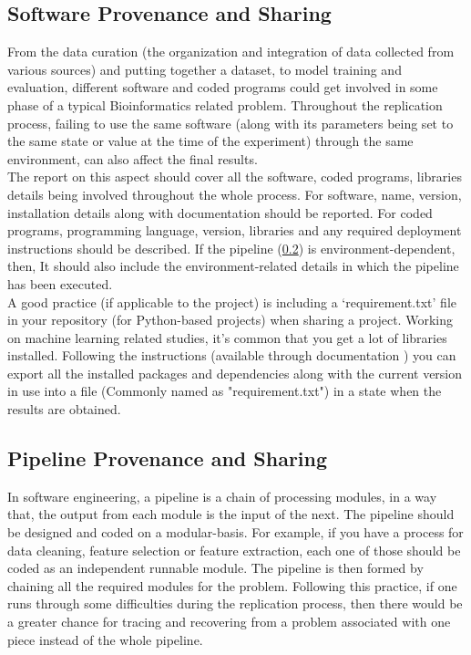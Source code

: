 \subsection{Software Provenance and Sharing}
    \label{sec:softwareProvenance}
    From the data curation (the organization and integration of data collected from various sources)
    and putting together a dataset, to model training and evaluation, different software and coded programs 
    could get involved in some phase of a typical Bioinformatics related problem. 
    Throughout the replication process, failing to use the same software (along with its parameters 
    being set to the same state or value at the time of the experiment) through the same environment, can also affect the final results. \\
    
    The report on this aspect should cover all the software, coded programs, libraries details being involved throughout the whole process. 
    For software, name, version, installation details along with documentation should be reported.
    For coded programs, programming language, version, libraries and any required deployment instructions should be described.
    If the pipeline (\ref{sec:PipelineProvenance}) is environment-dependent, then, It should also include the environment-related 
    details in which the pipeline has been executed.\\

    A good practice (if applicable to the project) is including a `requirement.txt' file in your repository (for Python-based projects)
    when sharing a project. Working on machine learning related studies, it’s common that you get a lot of libraries installed. 
    Following the instructions (available through documentation \cite{pipDoc}) you can export all the 
    installed packages and dependencies along with the current version in use into a file (Commonly named as "requirement.txt") in a state when
    the results are obtained.
    

\subsection{Pipeline Provenance and Sharing}
    \label{sec:PipelineProvenance}
    In software engineering, a pipeline is a chain of processing modules, in a way that, the output from each module is the 
    input of the next. The pipeline should be designed and coded on a modular-basis. For example, if you have a process for data cleaning, 
    feature selection or feature extraction, each one of those should be coded as an independent runnable module. The pipeline is then formed 
    by chaining all the required modules for the problem. Following this practice, if one runs through some difficulties during the replication process, 
    then there would be a greater chance for tracing and recovering from a problem associated with one piece instead of the 
    whole pipeline.\\
    
